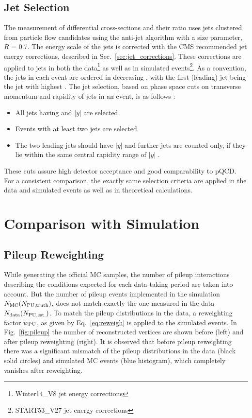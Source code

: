 \subsection{Jet Selection}
The measurement of differential cross-sections and their ratio uses jets clustered from particle flow candidates using the anti-\kt jet algorithm with a size parameter, $R$ = 0.7. The energy scale of the jets is corrected with the CMS recommended jet energy corrections, described in Sec.~\ref{sec:jet_corrections}. These corrections are applied to jets in both the data\footnote{Winter14\_V8 jet energy corrections} as well as in simulated events\footnote{START53\_V27 jet energy corrections}. As a convention, the jets in each event are ordered in decreasing \pt, with the first (leading) jet being the jet with highest \pt. The jet selection, based on phase space cuts on transverse momentum and rapidity of jets in an event, is as follows : 

\begin{itemize}
\item All jets having \pt {} \GeV and $|y|$  are selected.
\item Events with at least two jets are selected.
\item The two leading jets should have $|y|$  and further jets are counted only, if they lie within the same central rapidity range of $|y|$ . 
\end{itemize}

These cuts assure high detector acceptance and good comparability to pQCD. For a consistent comparison, the exactly same selection criteria are applied in the data and simulated events as well as in theoretical calculations. 

\section{Comparison with Simulation}
\subsection{Pileup Reweighting}
While generating the official MC samples, the number of pileup interactions describing the conditions expected for each data-taking period are taken into account. But the number of pileup events implemented in the simulation $N_{\rm MC} (N_{\rm PU,truth})$, does not match exactly the one measured in the data $N_{\rm data} (N_{\rm PU,est.})$. To match the pileup distributions in the data, a reweighting factor $w_{\rm PU}$, as given by Eq.~\ref{eq:reweigh} is applied to the simulated events. In Fig.~\ref{fig:pileup} the number of reconstructed vertices are shown before (left) and after pileup reweighting (right). It is observed that before pileup reweighting there was a significant mismatch of the pileup distributions in the data (black solid circles) and simulated MC events (blue histogram), which completely vanishes after reweighting. 

